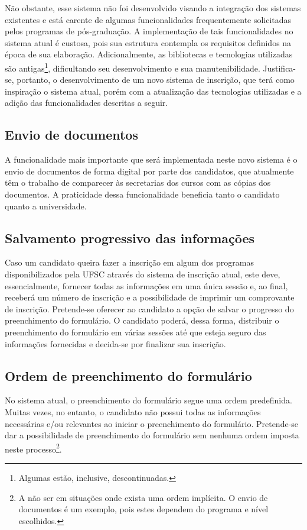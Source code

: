 \documentclass[
  10.5pt,				  %
	openright,			%
	twoside,			  %
  a5paper,
  chapter=TITLE,	%
	section=TITLE,	%
  hyphens,        %
	english,        %
	brazil          %
]{abntex2}
\begin{document}
Não obstante, esse sistema não foi desenvolvido visando a integração dos sistemas existentes e está carente de algumas funcionalidades frequentemente solicitadas pelos programas de pós-graduação. A implementação de tais funcionalidades no sistema atual é custosa, pois sua estrutura contempla os requisitos definidos na época de sua elaboração. Adicionalmente, as bibliotecas e tecnologias utilizadas são antigas\footnote{Algumas estão, inclusive, descontinuadas.}, dificultando seu desenvolvimento e sua manutenibilidade. Justifica-se, portanto, o desenvolvimento de um novo sistema de inscrição, que terá como inspiração o sistema atual, porém com a atualização das tecnologias utilizadas e a adição das funcionalidades descritas a seguir.

\subsection{Envio de documentos}
A funcionalidade mais importante que será implementada neste novo sistema é o envio de documentos de forma digital por parte dos candidatos, que atualmente têm o trabalho de comparecer às secretarias dos cursos com as cópias dos documentos. A praticidade dessa funcionalidade beneficia tanto o candidato quanto a universidade.

\subsection{Salvamento progressivo das informações}
Caso um candidato queira fazer a inscrição em algum dos programas disponibilizados pela UFSC através do sistema de inscrição atual, este deve, essencialmente, fornecer todas as informações em uma única sessão e, ao final, receberá um número de inscrição e a possibilidade de imprimir um comprovante de inscrição. Pretende-se oferecer ao candidato a opção de salvar o progresso do preenchimento do formulário. O candidato poderá, dessa forma, distribuir o preenchimento do formulário em várias sessões até que esteja seguro das informações fornecidas e decida-se por finalizar sua inscrição.

\subsection{Ordem de preenchimento do formulário}
No sistema atual, o preenchimento do formulário segue uma ordem predefinida. Muitas vezes, no entanto, o candidato não possui todas as informações necessárias e/ou relevantes ao iniciar o preenchimento do formulário. Pretende-se dar a possibilidade de preenchimento do formulário sem nenhuma ordem imposta neste processo\footnote{A não ser em situações onde exista uma ordem implícita. O envio de documentos é um exemplo, pois estes dependem do programa e nível escolhidos.}.
\end{document}
